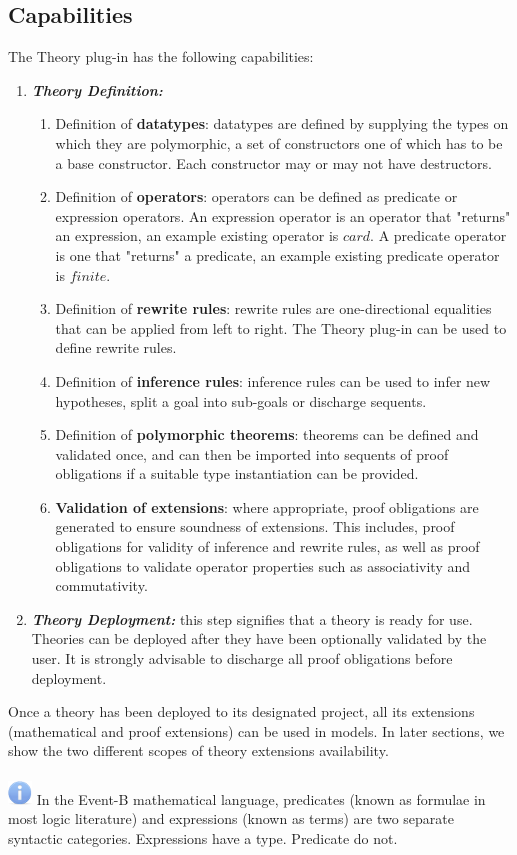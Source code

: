 \documentclass{article}      %
\begin{document}
\subsection{Capabilities}
The Theory plug-in has the following capabilities:
\begin{enumerate}
	\item \textbf{\textit{Theory Definition:}}
		\begin{enumerate}
			\item Definition of \textbf{datatypes}: datatypes are defined by supplying the types on which they are polymorphic, a set of constructors one of which has to be a base constructor. Each constructor may or may not have destructors.
			\item Definition of \textbf{operators}: operators can be defined as predicate or expression operators. An expression operator is an operator that "returns" an expression, an example existing operator is $card$. A predicate operator is one that "returns" a predicate, an example existing predicate operator is $finite$.
			\item Definition of \textbf{rewrite rules}: rewrite rules are one-directional equalities that can be applied from left to right. The Theory plug-in can be used to define rewrite rules.
			\item Definition of \textbf{inference rules}: inference rules can be used to infer new hypotheses, split a goal into sub-goals or discharge sequents.
			\item Definition of \textbf{polymorphic theorems}: theorems can be defined and validated once, and can then be imported into sequents of proof obligations if a suitable type instantiation can be provided.
			\item \textbf{Validation of extensions}: where appropriate, proof obligations are generated to ensure soundness of extensions. This includes, proof obligations for validity of inference and rewrite rules, as well as proof obligations to validate operator properties such as associativity and commutativity.
		\end{enumerate}
	\item \textbf{\textit{Theory Deployment:}} this step signifies that a theory is ready for use. Theories can be deployed after they have been optionally validated by the user. It is strongly advisable to discharge all proof obligations before deployment.
\end{enumerate}
Once a theory has been deployed to its designated project, all its extensions (mathematical and proof extensions) can be used in models. In later sections, we show the two different scopes of theory extensions availability.
\\
\\
\includegraphics{images/info.png} In the Event-B mathematical language, predicates (known as formulae in most logic literature) and expressions (known as terms) are two separate syntactic categories. Expressions have a type. Predicate do not.





\end{document}
